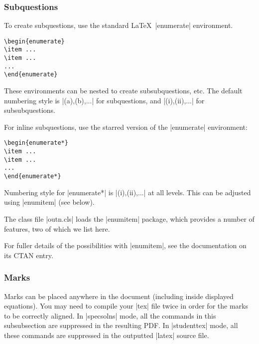 \documentclass[a4paper]{ltxguide}
\newcommand\3{\unskip\enspace\fbox{\fontsize{4}{4}\selectfont NEW 3.0}}
\begin{document}
\subsubsection{Subquestions}
To create subquestions, use the standard \LaTeX\ |enumerate| environment.

\begin{verbatim}
\begin{enumerate}
\item ...
\item ...
...
\end{enumerate}
\end{verbatim}

These environments can be nested to create subsubquestions, etc. The default numbering style is |(a),(b),...| for subquestions, and |(i),(ii),...| for subsubquestions.

For inline subquestions, use the starred version of the |enumerate| environment:

\begin{verbatim}
\begin{enumerate*}
\item ...
\item ...
...
\end{enumerate*}
\end{verbatim}

Numbering style for |enumerate*| is |(i),(ii),...| at all levels. This can be adjusted using |enumitem| (see below).

The class file |outn.cls| loads the |enumitem| package, which provides a number of features, two of which we list here.


For fuller details of the possibilities with |enumitem|, see the documentation on its CTAN entry.

\subsubsection{Marks}
Marks can be placed anywhere in the document (including inside displayed equations). You may need to  compile your |tex| file twice in order for the marks to be correctly aligned. In |specsolns| mode, all the commands in this subsubsection are suppressed in the resulting PDF. In |studenttex| mode, all these commands are suppressed in the outputted |latex| source file.
\end{document}
